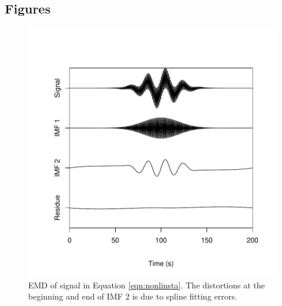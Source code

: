 \documentclass[12pt]{article}
\begin{document}
\FloatBarrier

\subsection{Figures}

\begin{figure}[ht]
\begin{center}
\includegraphics{interesting_signals-nonlinstaimfs}
\end{center}
\caption{EMD of signal in Equation \ref{eqn:nonlinsta}.
The distortions at the beginning and end of IMF 2 is due to spline fitting errors.}
\label{fig:nonlinstaimfs}
\end{figure}
\end{document}
